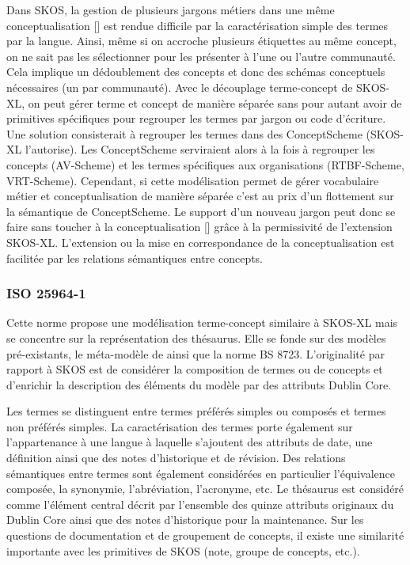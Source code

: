 Dans SKOS, la gestion de plusieurs jargons métiers dans une même conceptualisation [] est rendue difficile par la caractérisation simple des termes par la langue. 
Ainsi, même si on accroche plusieurs étiquettes au même concept, on ne sait pas les sélectionner pour les présenter à l'une ou l'autre communauté. 
Cela implique un dédoublement des concepts et donc des schémas conceptuels nécessaires (un par communauté).%
Avec le découplage terme-concept de SKOS-XL, on peut gérer terme et concept de manière séparée sans pour autant avoir de primitives spécifiques pour regrouper les termes par jargon ou code d'écriture.%
Une solution consisterait à regrouper les termes dans des ConceptScheme (SKOS-XL l'autorise).
Les ConceptScheme serviraient alors à la fois à regrouper les concepts (AV-Scheme) et les termes spécifiques aux organisations (RTBF-Scheme, VRT-Scheme). 
Cependant, si cette modélisation permet de gérer vocabulaire métier et conceptualisation de manière séparée c'est au prix d'un flottement sur la sémantique de ConceptScheme. 
Le support d'un nouveau jargon peut donc se faire sans toucher à la conceptualisation [] grâce à la permissivité de l'extension SKOS-XL. 
L'extension ou la mise en correspondance de la conceptualisation est facilitée par les relations sémantiques entre concepts.


\subsubsection{ISO 25964-1}
Cette norme propose une modélisation terme-concept similaire à SKOS-XL mais se concentre sur la représentation des thésaurus. 
Elle se fonde sur des modèles pré-existants, le méta-modèle de \cite{Vandenbussche2009} ainsi que la norme BS 8723. 
L'originalité par rapport à SKOS est de considérer la composition de termes ou de concepts et d'enrichir la description des éléments du modèle par des attributs Dublin Core.

Les termes se distinguent entre termes préférés simples ou composés et termes non préférés simples. 
La caractérisation des termes porte également sur l'appartenance à une langue à laquelle s'ajoutent des attributs de date, une définition ainsi que des notes d'historique et de révision. 
Des relations sémantiques entre termes sont également considérées en particulier l'équivalence composée, la synonymie, l'abréviation, l'acronyme, etc. 
Le thésaurus est considéré comme l'élément central décrit par l'ensemble des quinze attributs originaux du Dublin Core ainsi que des notes d'historique pour la maintenance. 
Sur les questions de documentation et de groupement de concepts, il existe une similarité importante avec les primitives de SKOS (note, groupe de concepts, etc.).\\

